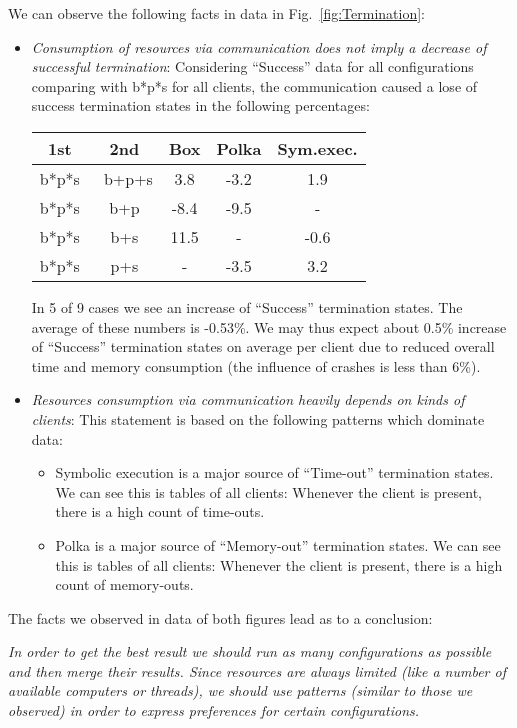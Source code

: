 \documentclass[envcountsame]{llncs}
\begin{document}
\noindent
We can observe the following facts in data in Fig.~\ref{fig:Termination}:
\begin{itemize}
\item \emph{Consumption of resources via communication does not imply a decrease
of successful termination}: Considering ``Success'' data for all configurations
comparing with b*p*s for all clients, the communication caused a lose of success
termination states in the following percentages:

\hspace{25mm}
\begin{tabular}{cc||ccc}
1st & 2nd & Box & Polka & Sym.exec.
\\ \hline
b*p*s & ~b+p+s &
3.8 &  -3.2 & 1.9    \\
b*p*s & b+p &
-8.4 & -9.5 & -
\\
b*p*s & b+s &
11.5 &  - &
-0.6    \\
b*p*s & p+s &
- &
-3.5 & 3.2   \end{tabular}


In 5 of 9 cases we see an increase of ``Success'' termination states. The
average of these numbers is -0.53\%. We may thus expect about 0.5\% increase of
``Success'' termination states on average per client due to reduced overall time
and memory consumption (the influence of crashes is less than 6\%). \item \emph{Resources consumption via communication heavily depends on kinds of
clients}: This statement is based on the following patterns which dominate
data:
\begin{itemize}
\item Symbolic execution is a major source of ``Time-out'' termination states.
We can see this is tables of all clients: Whenever the client is present, there
is a high count of time-outs. \item Polka is a major source of ``Memory-out'' termination states.
We can see this is tables of all clients: Whenever the client is present, there
is a high count of memory-outs. \end{itemize}
\end{itemize}

\noindent
The facts we observed in data of both figures lead as to a conclusion:
\vspace{2mm}

\emph{In order to get the best result we should run as many configurations as
possible and then merge their results. Since resources are always limited (like
a number of available computers or threads), we should use patterns (similar to
those we observed) in order to express preferences for certain configurations.}
\end{document}
